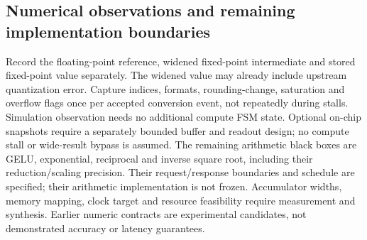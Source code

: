 \subsection{Numerical observations and remaining implementation boundaries}
Record the floating-point reference, widened fixed-point intermediate and stored fixed-point value separately. The widened value may already include upstream quantization error. Capture indices, formats, rounding-change, saturation and overflow flags once per accepted conversion event, not repeatedly during stalls. Simulation observation needs no additional compute FSM state. Optional on-chip snapshots require a separately bounded buffer and readout design; no compute stall or wide-result bypass is assumed.
The remaining arithmetic black boxes are GELU, exponential, reciprocal and inverse square root, including their reduction/scaling precision. Their request/response boundaries and schedule are specified; their arithmetic implementation is not frozen. Accumulator widths, memory mapping, clock target and resource feasibility require measurement and synthesis. Earlier numeric contracts are experimental candidates, not demonstrated accuracy or latency guarantees.
